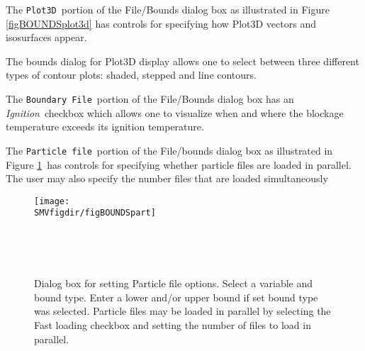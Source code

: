 \documentclass[11pt,twoside]{book}
\begin{document}
The {\tt Plot3D}\ portion of the File/Bounds dialog box as illustrated in Figure \ref{figBOUNDSplot3d} has controls for specifying how Plot3D vectors and isosurfaces appear.

The bounds dialog for Plot3D display allows one to select between
three different types of contour plots:  shaded, stepped and line
contours.

The {\tt Boundary File}\ portion of the File/Bounds dialog
box has an {\em Ignition}\ checkbox which allows one to visualize
when and where the blockage temperature exceeds its ignition
temperature.

The {\tt Particle file}\ portion of the File/bounds dialog box
as illustrated in Figure \ref{figBOUNDSpart}\
has controls for specifying whether particle files are loaded in parallel.
The user may also specify the number files that are loaded simultaneously

\begin{figure}[bph]
\centerline{
\texttt{[image: \\SMVfigdir/figBOUNDSpart]}
}\ \caption[Dialog box for setting Particle file
options.] {Dialog box for setting Particle file
options. Select a variable and bound type. Enter a lower
and/or upper bound if set bound type was selected. Particle files may be loaded in parallel by
selecting the Fast loading checkbox and setting the number of files to load in parallel.
 }\ \label{figBOUNDSpart}
\end{figure}


\end{document}
